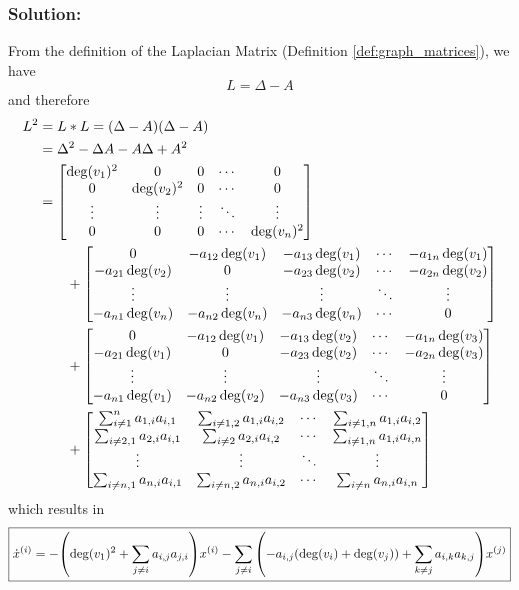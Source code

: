 \documentclass[]{article}
\numberwithin{equation}{section}
\begin{document}
\subsubsection*{Solution:}
From the definition of the Laplacian Matrix (Definition \ref{def:graph_matrices}), we have\[
    L = \Delta - A
\] and therefore \begin{align*}
    L^2 &= L * L = (\Delta - A) (\Delta - A)\\
        &= \Delta^2 - \Delta A - A \Delta + A^2\\
        &= \mqty[
            \deg(v_1)^2	&0	&0	&\cdots	&0\\
            0		&\deg(v_2)^2	&0	&\cdots	&0\\
            \vdots		&\vdots		&\vdots		&\ddots	&\vdots\\
            0		&0	&0	&\cdots	&\deg(v_n)^2
        ] \\ &\qquad + \mqty[
            0	&-a_{12} \deg(v_1)	&-a_{13} \deg(v_1)	&\cdots	&-a_{1n} \deg(v_1)\\
            -a_{21}	\deg(v_2)	&0	&-a_{23} \deg(v_2)	&\cdots	&-a_{2n} \deg(v_2)\\
            \vdots		&\vdots		&\vdots		&\ddots	&\vdots\\
            -a_{n1}	\deg(v_n)	&-a_{n2} \deg(v_n)	&-a_{n3} \deg(v_n)	&\cdots	&0
        ] \\ &\qquad + \mqty[
            0	&-a_{12} \deg(v_1)	&-a_{13} \deg(v_2)	&\cdots	&-a_{1n} \deg(v_3)\\
            -a_{21}	\deg(v_1)	&0	&-a_{23} \deg(v_2)	&\cdots	&-a_{2n} \deg(v_3)\\
            \vdots		&\vdots		&\vdots		&\ddots	&\vdots\\
            -a_{n1}	\deg(v_1)	&-a_{n2} \deg(v_2)	&-a_{n3} \deg(v_3)	&\cdots	&0
        ] \\ &\qquad + \mqty[
            \sum_{i \neq 1}^n a_{1,i} a_{i,1} & \sum_{i \neq 1,2} a_{1,i} a_{i,2} & \cdots &\sum_{i \neq 1,n} a_{1,i} a_{i,2}\\
            \sum_{i \neq 2,1} a_{2,i} a_{i,1} & \sum_{i \neq 2} a_{2,i} a_{i,2} & \cdots & \sum_{i \neq 1,n} a_{1,i} a_{i,n}\\
            \vdots  &  \vdots &\ddots &\vdots\\
            \sum_{i \neq n,1} a_{n,i} a_{i,1} & \sum_{i \neq n,2} a_{n,i} a_{i,2} &\cdots &\sum_{i\neq n} a_{n,i} a_{i,n}
        ]
\end{align*}
which results in \[\boxed{
    \dot{x}^{(i)} = - \qty(\deg(v_1)^2 + \sum_{j \neq i} a_{i,j} a_{j,i}) x^{(i)} 
                    - \sum_{j \neq i} \qty(-a_{i,j} (\deg(v_i) + \deg(v_j)) + \sum_{k \neq j} a_{i,k} a_{k,j}) x^{(j)}
}\]
\end{document}

